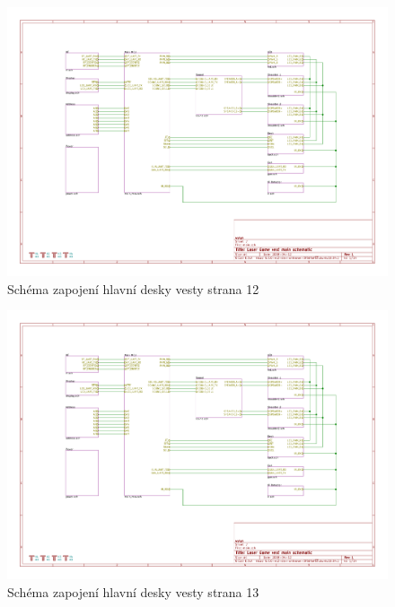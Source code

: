\begin{landscape}
    \begin{figure}[h]
        \centering
        \includegraphics[page=12, height=\textwidth]{sch/main}
        \caption{Schéma zapojení hlavní desky vesty strana 12}
    \end{figure}
\end{landscape}
\begin{landscape}
    \begin{figure}[h]
        \centering
        \includegraphics[page=13, height=\textwidth]{sch/main}
        \caption{Schéma zapojení hlavní desky vesty strana 13}
    \end{figure}
\end{landscape}
